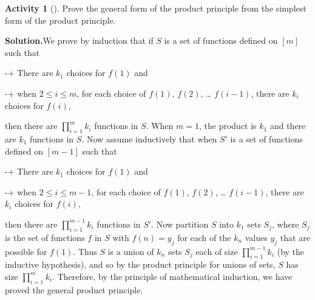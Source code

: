 \documentclass[10pt,]{book}
\theoremstyle{plain}
\theoremstyle{definition}
\newtheorem{activity}[project]{Activity}
\numberwithin{equation}{chapter}
\begin{document}
\begin{activity}[]\label{generalproductprincipleproof}
Prove the general form of the product principle from the simplest form of the product principle.%
\par\medskip\noindent%
\textbf{Solution.}\quad We prove by induction that if \(S\) is a set of functions defined on \([m]\) such that%
\par
-+ There are \(k_1\) choices for \(f(1)\) and%
\par
-+ when \(2\le i\le m\), for each choice of \(f(1)\), \(f(2)\), \dots{} \(f(i-1)\), there are \(k_i\) choices for \(f(i)\),%
\par
then there are \(\prod_{i=1}^m k_i\) functions in \(S\). When \(m=1\), the product is \(k_1\) and there are \(k_1\) functions in \(S\). Now assume inductively that when \(S'\) is a set of functions defined on \([m-1]\) such that%
\par
-+ There are \(k_1\) choices for \(f(1)\) and%
\par
-+ when \(2\le i\le m-1\), for each choice of \(f(1)\), \(f(2)\), \dots{} \(f(i-1)\), there are \(k_i\) choices for \(f(i)\),%
\par
then there are \(\prod_{i=1}^{m-1} k_i\) functions in \(S'\). Now partition \(S\) into \(k_1\) sets \(S_j\), where \(S_j\) is the set of functions \(f\) in \(S\) with \(f(n) = y_j\) for each of the \(k_n\) values \(y_j\) that are possible for \(f(1)\). Thus \(S\) is a union of \(k_n\) sets \(S_j\) each of size \(\prod_{i=1}^{m-1} k_i\) (by the inductive hypothesis), and so by the product principle for unions of sets, \(S\) has size \(\prod_{i=1}^{m} k_i\). Therefore, by the principle of mathematical induction, we have proved the general product principle.%
\end{activity}
\typeout{************************************************}
\typeout{************************************************}
\end{document}
